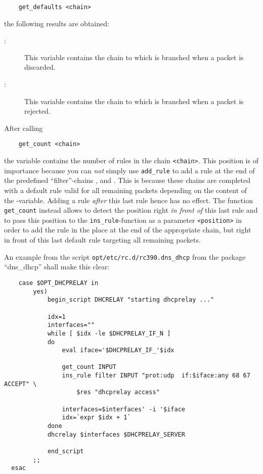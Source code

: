 \begin{example}
\begin{verbatim}
    get_defaults <chain>
\end{verbatim}
\end{example}

the following results are obtained:

\begin{description}
\item[:] This variable contains the chain to which is branched
   when a packet is discarded.
\item[:] This variable contains the chain to which is branched
   when a packet is rejected.
\end{description}

After calling

\begin{example}
\begin{verbatim}
    get_count <chain>
\end{verbatim}
\end{example}

the variable  contains the number of rules in the chain
\texttt{<chain>}. This position is of importance because you can \emph{not}
simply use \texttt{add\_rule} to add a rule at the end of the predefined
``filter''-chains ,  and .
This is because these chains are completed with a default rule valid for
all remaining packets depending on the content of the -variable.
Adding a rule \emph{after} this last rule hence has no effect. The function
\texttt{get\_count} instead allows to detect the position right \emph{in front of}
this last rule and to pass this position to the \texttt{ins\_rule}-function as a
parameter \texttt{<position>} in order to add the rule in the place at the end of the
appropriate chain, but right in front of this last default rule targeting
all remaining packets.

An example from the script \texttt{opt/etc/rc.d/rc390.dns\_dhcp} from the
package ``dns\_dhcp'' shall make this clear:

\begin{example}
\begin{verbatim}
    case $OPT_DHCPRELAY in
        yes)
            begin_script DHCRELAY "starting dhcprelay ..."

            idx=1
            interfaces=""
            while [ $idx -le $DHCPRELAY_IF_N ]
            do
                eval iface='$DHCPRELAY_IF_'$idx

                get_count INPUT
                ins_rule filter INPUT "prot:udp  if:$iface:any 68 67 ACCEPT" \
                    $res "dhcprelay access"

                interfaces=$interfaces' -i '$iface
                idx=`expr $idx + 1`
            done
            dhcrelay $interfaces $DHCPRELAY_SERVER

            end_script
        ;;
  esac
\end{verbatim}
\end{example}

